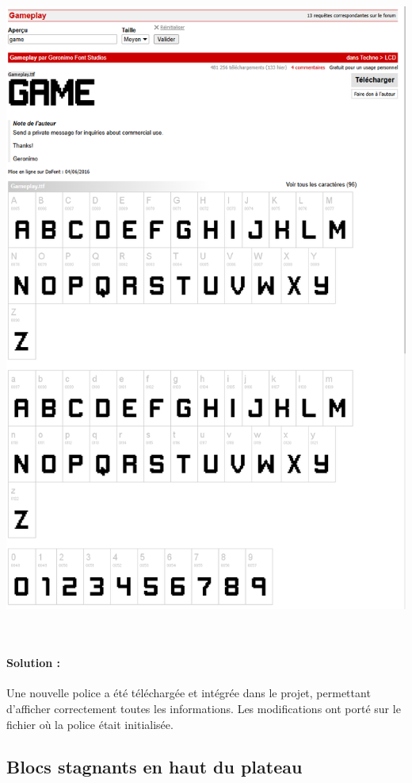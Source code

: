 \documentclass[12pt,a4paper]{report}
\begin{document}
\begin{center}
\includegraphics[scale=0.35]{Figure_GAMEPLAY.png} 

\end{center}
\\
\paragraph{Solution :}
Une nouvelle police a été téléchargée et intégrée dans le projet, permettant d’afficher correctement toutes les informations. Les modifications ont porté sur le fichier où la police était initialisée.

\subsection{Blocs stagnants en haut du plateau}
\end{document}
